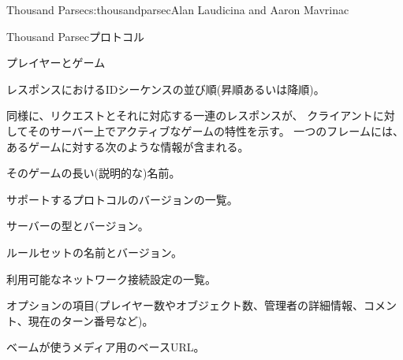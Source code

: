 \begin{aosachapter}{Thousand Parsec}{s:thousandparsec}{Alan Laudicina and Aaron Mavrinac}
\begin{aosasect1}{Thousand Parsecプロトコル}
\begin{aosasect2}{プレイヤーとゲーム}
\begin{aosaitemize}
  \item レスポンスにおけるIDシーケンスの並び順(昇順あるいは降順)。

\end{aosaitemize}

同様に、リクエストとそれに対応する一連のレスポンスが、
クライアントに対してそのサーバー上でアクティブなゲームの特性を示す。
一つのフレームには、あるゲームに対する次のような情報が含まれる。

\begin{aosaitemize}

  \item そのゲームの長い(説明的な)名前。

  \item サポートするプロトコルのバージョンの一覧。

  \item サーバーの型とバージョン。

  \item ルールセットの名前とバージョン。

  \item 利用可能なネットワーク接続設定の一覧。

  \item オプションの項目(プレイヤー数やオブジェクト数、管理者の詳細情報、コメント、現在のターン番号など)。

  \item ベームが使うメディア用のベースURL。


\end{aosaitemize}
\end{aosasect2}
\end{aosasect1}
\end{aosachapter}

